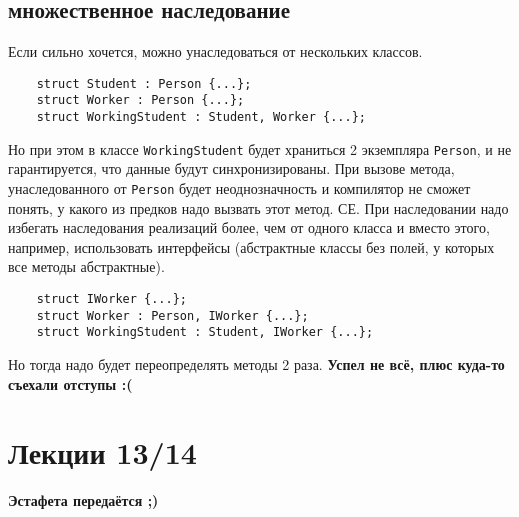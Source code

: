 \documentclass[15pt, a4paper]{article}
\newcommand{\nl}{\newline}
\begin{document}
\subsection{множественное наследование}
Если сильно хочется, можно унаследоваться от нескольких классов.
\begin{verbatim}
    struct Student : Person {...};
    struct Worker : Person {...};
    struct WorkingStudent : Student, Worker {...};
\end{verbatim}
Но при этом в классе \texttt{WorkingStudent} будет храниться 2 экземпляра \texttt{Person},  и не гарантируется, 
что данные будут синхронизированы. При вызове метода, унаследованного от \texttt{Person} будет 
неоднозначность и компилятор не сможет понять, у какого из предков надо вызвать этот метод. СЕ.\nl
При наследовании надо избегать наследования реализаций более, чем от одного класса и вместо этого, например, 
использовать интерфейсы (абстрактные классы без полей, у которых все методы абстрактные).
\begin{verbatim}
    struct IWorker {...};
    struct Worker : Person, IWorker {...};
    struct WorkingStudent : Student, IWorker {...};
\end{verbatim}
Но тогда надо будет переопределять методы 2 раза.\nl
\textbf{Успел не всё, плюс куда-то съехали отступы :(}
\section{Лекции 13/14}
\textbf{Эстафета передаётся ;)}
\end{document}
